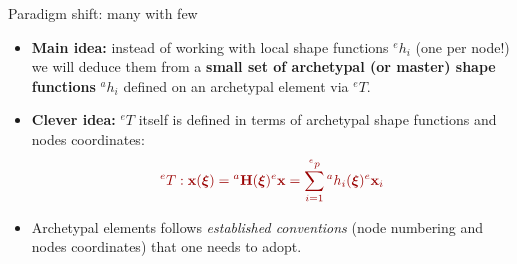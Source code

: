\documentclass[aspectratio=169]{beamer}
\begin{document}
{  \begin{frame}{Paradigm shift: many with few}
      \begin{itemize}
          \item[\HandRight] {\color{darkred}\textbf{Main idea:}} instead of working with local shape functions ${}^eh_i$ (one per node!) we will deduce them from a \textbf{small set of archetypal (or master) shape functions}  ${}^ah_i$ defined on an archetypal element via ${}^eT$.
      \end{itemize}
      \begin{center}
      \end{center}
      \begin{itemize}
          \item[\HandRight] {\color{darkred}\textbf{Clever idea:}} ${}^eT$ itself is defined in terms of archetypal shape functions and nodes coordinates:
                \[
                    {\color{darkred}{}^eT : \mathbf x(\boldxi) = {}^a\mathbf H(\boldxi) ^e{} \mathbf x=\sum_{i=1}^{{}^ep}{}^a h_i(\boldxi){}^e\mathbf x_i       }
                \]
          \item[\HandRight] Archetypal elements follows \emph{established conventions} (node numbering and nodes coordinates) that one needs to adopt.
      \end{itemize}
  \end{frame}

}
\end{document}
